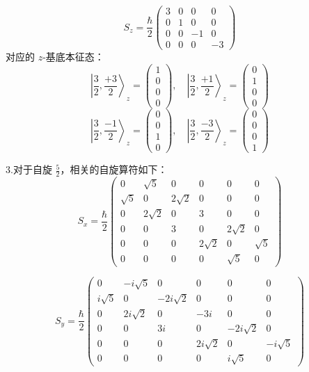 \[
S_z = \frac{\hbar}{2}
\begin{pmatrix}
3 & 0 & 0 & 0 \\
0 & 1 & 0 & 0 \\
0 & 0 & -1 & 0 \\
0 & 0 & 0 & -3
\end{pmatrix}~
\]
对应的 \( z \)-基底本征态：
\[
\left| \frac{3}{2},\frac{+3}{2} \right\rangle_z =
\begin{pmatrix}
1 \\
0 \\
0 \\
0
\end{pmatrix},
\quad
\left| \frac{3}{2},\frac{+1}{2} \right\rangle_z =
\begin{pmatrix}
0 \\
1 \\
0 \\
0
\end{pmatrix}~
\]
\[
\left| \frac{3}{2}, \frac{-1}{2} \right\rangle_z =
\begin{pmatrix}
0 \\
0 \\
1 \\
0
\end{pmatrix},
\quad
\left| \frac{3}{2}, \frac{-3}{2} \right\rangle_z =
\begin{pmatrix}
0 \\
0 \\
0 \\
1
\end{pmatrix}~
\]

3.对于自旋 \( \frac{5}{2} \)，相关的自旋算符如下：
\[
S_x = \frac{\hbar}{2}
\begin{pmatrix}
0 & \sqrt{5} & 0 & 0 & 0 & 0 \\
\sqrt{5} & 0 & 2\sqrt{2} & 0 & 0 & 0 \\
0 & 2\sqrt{2} & 0 & 3 & 0 & 0 \\
0 & 0 & 3 & 0 & 2\sqrt{2} & 0 \\
0 & 0 & 0 & 2\sqrt{2} & 0 & \sqrt{5} \\
0 & 0 & 0 & 0 & \sqrt{5} & 0
\end{pmatrix}~
\]


\[
S_y = \frac{\hbar}{2}
\begin{pmatrix}
0 & -i\sqrt{5} & 0 & 0 & 0 & 0 \\
i\sqrt{5} & 0 & -2i\sqrt{2} & 0 & 0 & 0 \\
0 & 2i\sqrt{2} & 0 & -3i & 0 & 0 \\
0 & 0 & 3i & 0 & -2i\sqrt{2} & 0 \\
0 & 0 & 0 & 2i\sqrt{2} & 0 & -i\sqrt{5} \\
0 & 0 & 0 & 0 & i\sqrt{5} & 0
\end{pmatrix}~
\]


